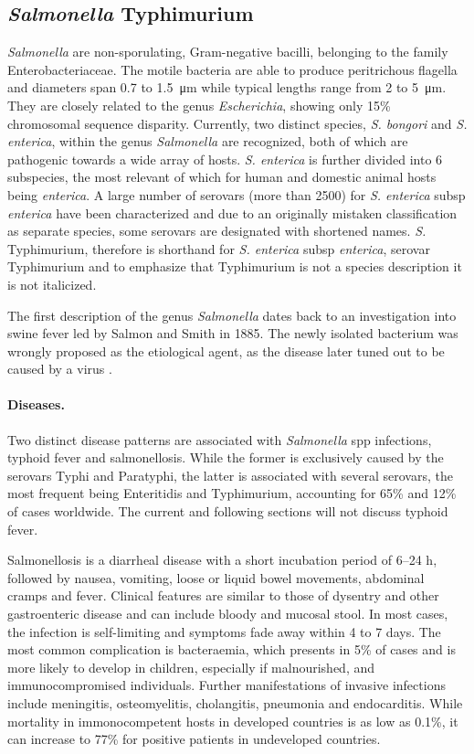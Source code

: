 \subsection{\textit{Salmonella} Typhimurium}
\textit{Salmonella} are non-sporulating, Gram-negative bacilli, belonging to the family Enterobacteriaceae. The motile bacteria are able to produce peritrichous flagella and diameters span 0.7 to \SI{1.5}{\micro\meter} while typical lengths range from 2 to \SI{5}{\micro\meter}. They are closely related to the genus \textit{Escherichia}, showing only 15\% chromosomal sequence disparity. Currently, two distinct species, \textit{S. bongori} and \textit{S. enterica}, within the genus \textit{Salmonella} are recognized, both of which are pathogenic towards a wide array of hosts. \textit{S. enterica} is further divided into 6 subspecies, the most relevant of which for human and domestic animal hosts being \textit{enterica}. A large number of serovars (more than 2500) for \textit{S. enterica} \acrshort{subsp} \textit{enterica} have been characterized and due to an originally mistaken classification as separate species, some serovars are designated with shortened names. \textit{S.} Typhimurium, therefore is shorthand for \textit{S. enterica} \acrshort{subsp} \textit{enterica}, serovar Typhimurium and to emphasize that Typhimurium is not a species description it is not italicized.

The first description of the genus \textit{Salmonella} dates back to an investigation into swine fever led by Salmon and Smith in 1885. The newly isolated bacterium was wrongly proposed as the etiological agent, as the disease later tuned out to be caused by a virus \citep{Fabrega2013,Haraga2008}.

\paragraph{Diseases.}
Two distinct disease patterns are associated with \textit{Salmonella} \acrshort{spp} infections, typhoid fever and salmonellosis. While the former is exclusively caused by the serovars Typhi and Paratyphi, the latter is associated with several serovars, the most frequent being Enteritidis and Typhimurium, accounting for 65\% and 12\% of cases worldwide. The current and following sections will not discuss typhoid fever.

Salmonellosis is a diarrheal disease with a short incubation period of 6--24 h, followed by nausea, vomiting, loose or liquid bowel movements, abdominal cramps and fever. Clinical features are similar to those of dysentry and other gastroenteric disease and can include bloody and mucosal stool. In most cases, the infection is self-limiting and symptoms fade away within 4 to 7 days. The most common complication is bacteraemia, which presents in 5\% of cases and is more likely to develop in children, especially if malnourished, and immunocompromised individuals. Further manifestations of invasive infections include meningitis, osteomyelitis, cholangitis, pneumonia and endocarditis. While mortality in immonocompetent hosts in developed countries is as low as 0.1\%, it can increase to 77\% for  positive patients in undeveloped countries.


